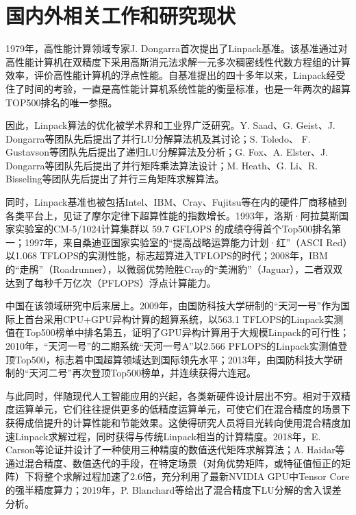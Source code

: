 \section{国内外相关工作和研究现状}

1979年，高性能计算领域专家J. Dongarra首次提出了Linpack基准\cite{dongarra1979linpack}。该基准通过对高性能计算机在双精度下采用高斯消元法求解一元多次稠密线性代数方程组的计算效率，评价高性能计算机的浮点性能。自基准提出的四十多年以来，Linpack经受住了时间的考验，一直是高性能计算机系统性能的衡量标准，也是一年两次的超算TOP500排名的唯一参照。

因此，Linpack算法的优化被学术界和工业界广泛研究。Y. Saad\cite{saad1986communication}、G. Geist\cite{geist1988lu}、J. Dongarra\cite{dongarra1994scalability,choi1996design}等团队先后提出了并行LU分解算法机及其讨论；S. Toledo\cite{toledo1997locality}、 F. Gustavson\cite{gustavson1997recursion}等团队先后提出了递归LU分解算法及分析；G. Fox\cite{fox1987matrix}、A. Elster\cite{elster1990basic}、J. Dongarra\cite{choi1996design}等团队先后提出了并行矩阵乘法算法设计；M. Heath\cite{heath1988parallel}、G. Li\cite{li1988parallel,li1989new}、R. Bisseling\cite{bisseling1991parallel}等团队先后提出了并行三角矩阵求解算法。

同时，Linpack基准也被包括Intel、IBM、Cray、Fujitsu等在内的硬件厂商移植到各类平台上，见证了摩尔定律下超算性能的指数增长。1993年，洛斯·阿拉莫斯国家实验室的CM-5/1024计算集群以 59.7 GFLOPS 的成绩夺得首个Top500排名第一；1997年，来自桑迪亚国家实验室的``提高战略运算能力计划·红''（ASCI Red）以1.068 TFLOPS的实测性能，标志超算进入TFLOPS的时代；2008年，IBM的``走鹃''（Roadrunner），以微弱优势险胜Cray的``美洲豹''（Jaguar），二者双双达到了每秒千万亿次（PFLOPS）浮点计算能力。

中国在该领域研究中后来居上。2009年，由国防科技大学研制的``天河一号''作为国际上首台采用CPU+GPU异构计算的超算系统，以563.1 TFLOPS的Linpack实测值在Top500榜单中排名第五，证明了GPU异构计算用于大规模Linpack的可行性\cite{wang2011optimizing}；2010年，``天河一号''的二期系统``天河一号A''以2.566 PFLOPS的Linpack实测值登顶Top500，标志着中国超算领域达到国际领先水平；2013年，由国防科技大学研制的``天河二号''再次登顶Top500榜单，并连续获得六连冠\cite{liao2014milkyway}。

与此同时，伴随现代人工智能应用的兴起，各类新硬件设计层出不穷。相对于双精度运算单元，它们往往提供更多的低精度运算单元，可使它们在混合精度的场景下获得成倍提升的计算性能和节能效果。这使得研究人员将目光转向使用混合精度加速Linpack求解过程，同时获得与传统Linpack相当的计算精度。2018年，E. Carson等\cite{carson2018accelerating}论证并设计了一种使用三种精度的数值迭代矩阵求解算法；A. Haidar等\cite{haidar2018harnessing}通过混合精度、数值迭代的手段，在特定场景（对角优势矩阵，或特征值恒正的矩阵）下将整个求解过程加速了2.6倍，充分利用了最新NVIDIA GPU中Tensor Core的强半精度算力；2019年，P. Blanchard等\cite{blanchard2020mixed}给出了混合精度下LU分解的舍入误差分析。


